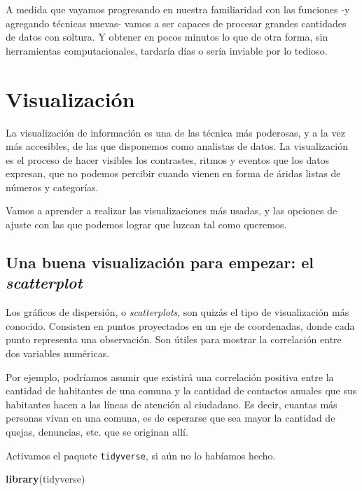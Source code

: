 \documentclass[]{book}
\newenvironment{Shaded}{\begin{snugshade}}{\end{snugshade}}
\newcommand{\KeywordTok}[1]{\textcolor[rgb]{0.13,0.29,0.53}{\textbf{#1}}}
\newcommand{\NormalTok}[1]{#1}
\begin{document}
A medida que vayamos progresando en nuestra familiaridad con las
funciones -y agregando técnicas nuevas- vamos a ser capaces de procesar
grandes cantidades de datos con soltura. Y obtener en pocos minutos lo
que de otra forma, sin herramientas computacionales, tardaría días o
sería inviable por lo tedioso.

\chapter{Visualización}\label{visualizacion}

La visualización de información es una de las técnica más poderosas, y a
la vez más accesibles, de las que disponemos como analistas de datos. La
visualización es el proceso de hacer visibles los contrastes, ritmos y
eventos que los datos expresan, que no podemos percibir cuando vienen en
forma de áridas listas de números y categorías.

Vamos a aprender a realizar las visualizaciones más usadas, y las
opciones de ajuste con las que podemos lograr que luzcan tal como
queremos.

\section{\texorpdfstring{Una buena visualización para empezar: el
\emph{scatterplot}}{Una buena visualización para empezar: el scatterplot}}\label{una-buena-visualizacion-para-empezar-el-scatterplot}

Los gráficos de dispersión, o \emph{scatterplots}, son quizás el tipo de
visualización más conocido. Consisten en puntos proyectados en un eje de
coordenadas, donde cada punto representa una observación. Son útiles
para mostrar la correlación entre dos variables numéricas.

Por ejemplo, podríamos asumir que existirá una correlación positiva
entre la cantidad de habitantes de una comuna y la cantidad de contactos
anuales que sus habitantes hacen a las líneas de atención al ciudadano.
Es decir, cuantas más personas vivan en una comuna, es de esperarse que
sea mayor la cantidad de quejas, denuncias, etc. que se originan allí.

Activamos el paquete \texttt{tidyverse}, si aún no lo habíamos hecho.

\begin{Shaded}
\begin{Highlighting}[]
\KeywordTok{library}\NormalTok{(tidyverse)}
\end{Highlighting}
\end{Shaded}
\end{document}
